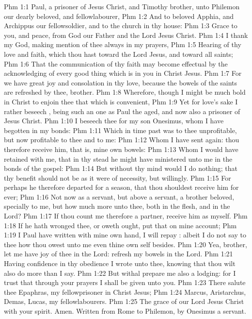 \vs Phm 1:1 Paul, a prisoner of Jesus Christ, and Timothy  brother, unto Philemon our dearly beloved, and fellowlabourer,
\vs Phm 1:2 And to  beloved Apphia, and Archippus our fellowsoldier, and to the church in thy house:
\vs Phm 1:3 Grace to you, and peace, from God our Father and the Lord Jesus Christ.
\vs Phm 1:4 I thank my God, making mention of thee always in my prayers,
\vs Phm 1:5 Hearing of thy love and faith, which thou hast toward the Lord Jesus, and toward all saints;
\vs Phm 1:6 That the communication of thy faith may become effectual by the acknowledging of every good thing which is in you in Christ Jesus.
\vs Phm 1:7 For we have great joy and consolation in thy love, because the bowels of the saints are refreshed by thee, brother.
\vs Phm 1:8 Wherefore, though I might be much bold in Christ to enjoin thee that which is convenient,
\vs Phm 1:9 Yet for love's sake I rather beseech , being such an one as Paul the aged, and now also a prisoner of Jesus Christ.
\vs Phm 1:10 I beseech thee for my son Onesimus, whom I have begotten in my bonds:
\vs Phm 1:11 Which in time past was to thee unprofitable, but now profitable to thee and to me:
\vs Phm 1:12 Whom I have sent again: thou therefore receive him, that is, mine own bowels:
\vs Phm 1:13 Whom I would have retained with me, that in thy stead he might have ministered unto me in the bonds of the gospel:
\vs Phm 1:14 But without thy mind would I do nothing; that thy benefit should not be as it were of necessity, but willingly.
\vs Phm 1:15 For perhaps he therefore departed for a season, that thou shouldest receive him for ever;
\vs Phm 1:16 Not now as a servant, but above a servant, a brother beloved, specially to me, but how much more unto thee, both in the flesh, and in the Lord?
\vs Phm 1:17 If thou count me therefore a partner, receive him as myself.
\vs Phm 1:18 If he hath wronged thee, or oweth  ought, put that on mine account;
\vs Phm 1:19 I Paul have written  with mine own hand, I will repay : albeit I do not say to thee how thou owest unto me even thine own self besides.
\vs Phm 1:20 Yea, brother, let me have joy of thee in the Lord: refresh my bowels in the Lord.
\vs Phm 1:21 Having confidence in thy obedience I wrote unto thee, knowing that thou wilt also do more than I say.
\vs Phm 1:22 But withal prepare me also a lodging: for I trust that through your prayers I shall be given unto you.
\vs Phm 1:23 There salute thee Epaphras, my fellowprisoner in Christ Jesus;
\vs Phm 1:24 Marcus, Aristarchus, Demas, Lucas, my fellowlabourers.
\vs Phm 1:25 The grace of our Lord Jesus Christ  with your spirit. Amen. Written from Rome to Philemon, by Onesimus a servant.
